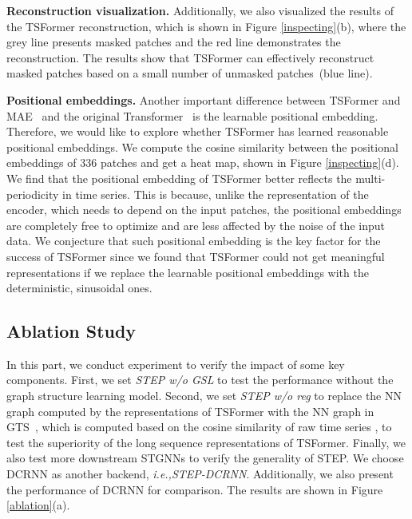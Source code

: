 \documentclass[sigconf]{acmart}
\newcommand{\ie}{\textit{i.e.,}\xspace}
\begin{document}
\noindent\textbf{Reconstruction visualization.}
Additionally, we also visualized the results of the TSFormer reconstruction, which is shown in Figure \ref{inspecting}(b), where the grey line presents masked patches and the red line demonstrates the reconstruction.
The results show that TSFormer can effectively reconstruct masked patches based on a small number of unmasked patches~(blue line).

\noindent\textbf{Positional embeddings.}
Another important difference between TSFormer and MAE~\cite{2021MAE} and the original Transformer~\cite{2017Transformer} is the learnable positional embedding. 
Therefore, we would like to explore whether TSFormer has learned reasonable positional embeddings.
We compute the cosine similarity between the positional embeddings of 336 patches and get a  heat map, shown in Figure \ref{inspecting}(d).
We find that the positional embedding of TSFormer better reflects the multi-periodicity in time series.
This is because, unlike the representation of the encoder, which needs to depend on the input patches, the positional embeddings are completely free to optimize and are less affected by the noise of the input data.
We conjecture that such positional embedding is the key factor for the success of TSFormer since we found that TSFormer could not get meaningful representations if we replace the learnable positional embeddings with the deterministic, sinusoidal ones.

\vspace{-0.2cm}
\subsection{Ablation Study}
In this part, we conduct experiment to verify the impact of some key components.
First, we set \textit{STEP w/o GSL} to test the performance without the graph structure learning model.
Second, we set \textit{STEP w/o reg} to replace the NN graph computed by the representations of TSFormer with the NN graph in GTS~\cite{2021GTS}, which is computed based on the cosine similarity of raw time series , to test the superiority of the long sequence representations of TSFormer.
Finally, we also test more downstream STGNNs to verify the generality of STEP.
We choose DCRNN as another backend, \ie \textit{STEP-DCRNN}.
Additionally, we also present the performance of DCRNN for comparison.
The results are shown in Figure \ref{ablation}(a).
\end{document}

